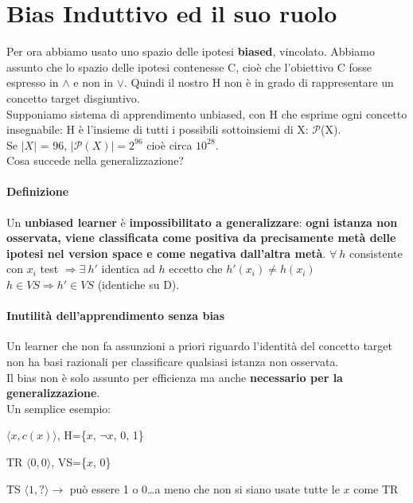 \documentclass[10pt]{book}
\begin{document}
\section{Bias Induttivo ed il suo ruolo}
Per ora abbiamo usato uno spazio delle ipotesi \textbf{biased}, vincolato. Abbiamo assunto che lo spazio delle ipotesi contenesse C, cioè che l'obiettivo C fosse espresso in $\wedge$ e non in $\vee$. Quindi il nostro H non è in grado di rappresentare un concetto target disgiuntivo.\\
Supponiamo sistema di apprendimento unbiased, con H che esprime ogni concetto insegnabile: H è l'insieme di tutti i possibili sottoinsiemi di X: $\mathscr{P}$(X).\\
Se $|X|$ = 96, $|\mathscr{P}(X)| = 2^{96}$ cioè circa $10^{28}$.\\
Cosa succede nella generalizzazione?
\paragraph{Definizione} Un \textbf{unbiased learner} è \textbf{impossibilitato a generalizzare}: \textbf{ogni istanza non osservata, viene classificata come positiva da precisamente metà delle ipotesi nel version space e come negativa dall'altra metà}. $\forall\:h$ consistente con $x_i$ test $\Rightarrow\exists\:h'$ identica ad $h$ eccetto che $h'(x_i) \neq h(x_i)$\\
$h \in VS \Rightarrow h' \in VS$ (identiche su D).\\
\paragraph{Inutilità dell'apprendimento senza bias} Un learner che non fa assunzioni a priori riguardo l'identità del concetto target non ha basi razionali per classificare qualsiasi istanza non osservata.\\Il bias non è solo assunto per efficienza ma anche \textbf{necessario per la generalizzazione}.\\
Un semplice esempio:
\begin{list}{}{}
	\item $\langle x, c(x)\rangle$, H=\{$x$, $\neg x$, 0, 1\}
	\item[TR] $\langle0,0\rangle$, VS=\{$x$, 0\}
	\item[TS] $\langle1, ?\rangle \rightarrow$ può essere 1 o 0\ldots a meno che non si siano usate tutte le $x$ come TR
\end{list}
\end{document}
